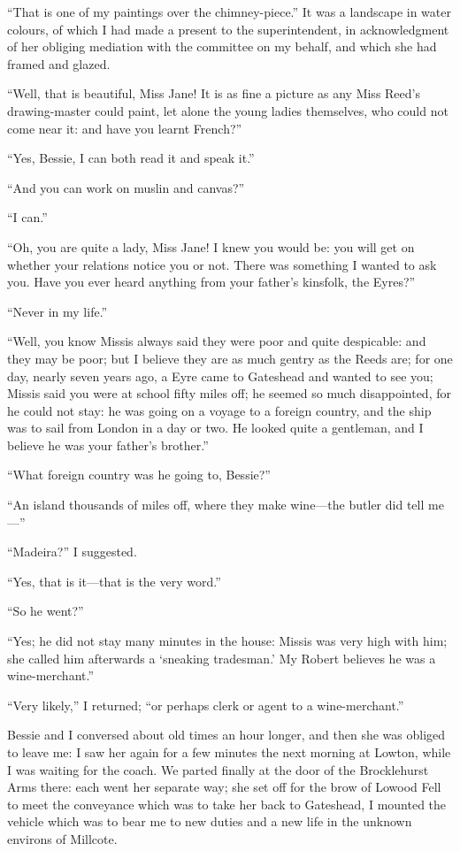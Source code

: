 \enquote{That is one of my paintings over the chimney-piece.} It was a
landscape in water colours, of which I had made a present to the
superintendent, in acknowledgment of her obliging mediation with the
committee on my behalf, and which she had framed and glazed.

\enquote{Well, that is beautiful, Miss Jane! It is as fine a picture as
	any Miss Reed's drawing-master could paint, let alone the young ladies
	themselves, who could not come near it: and have you learnt French?}

\enquote{Yes, Bessie, I can both read it and speak it.}

\enquote{And you can work on muslin and canvas?}

\enquote{I can.}

\enquote{Oh, you are quite a lady, Miss Jane! I knew you would be: you
	will get on whether your relations notice you or not. There was
	something I wanted to ask you. Have you ever heard anything from your
	father's kinsfolk, the Eyres?}

\enquote{Never in my life.}

\enquote{Well, you know Missis always said they were poor and quite
	despicable: and they may be poor; but I believe they are as much gentry
	as the Reeds are; for one day, nearly seven years ago, a \Mr{} Eyre came
	to Gateshead and wanted to see you; Missis said you were at school fifty
	miles off; he seemed so much disappointed, for he could not stay: he was
	going on a voyage to a foreign country, and the ship was to sail from
	London in a day or two. He looked quite a gentleman, and I believe he
	was your father's brother.}

\enquote{What foreign country was he going to, Bessie?}

\enquote{An island thousands of miles off, where they make wine---the
	butler did tell me---}

\enquote{Madeira?} I suggested.

\enquote{Yes, that is it---that is the very word.}

\enquote{So he went?}

\enquote{Yes; he did not stay many minutes in the house: Missis was very
	high with him; she called him afterwards a \enquote{sneaking
		tradesman.} My Robert believes he was a wine-merchant.}

\enquote{Very likely,} I returned; \enquote{or perhaps clerk or agent to
	a wine-merchant.}

Bessie and I conversed about old times an hour longer, and then she was
obliged to leave me: I saw her again for a few minutes the next morning
at Lowton, while I was waiting for the coach. We parted finally at the
door of the Brocklehurst Arms there: each went her separate way; she set
off for the brow of Lowood Fell to meet the conveyance which was to take
her back to Gateshead, I mounted the vehicle which was to bear me to new
duties and a new life in the unknown environs of Millcote.
